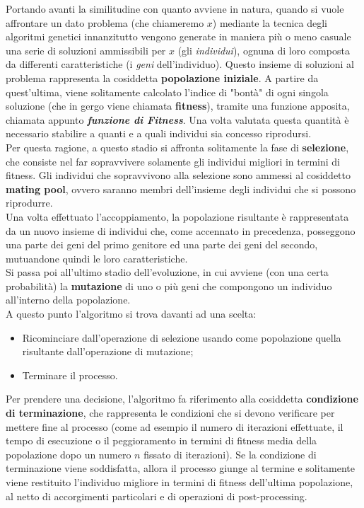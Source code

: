     Portando avanti la similitudine con quanto avviene in natura, quando si vuole affrontare un dato problema (che chiameremo $x$) mediante la tecnica degli algoritmi genetici innanzitutto vengono generate in maniera più o meno casuale una serie di soluzioni ammissibili per $x$ (gli \textit{individui}), ognuna di loro composta da differenti caratteristiche (i \textit{geni} dell'individuo). Questo insieme di soluzioni al problema rappresenta la cosiddetta \textbf{popolazione iniziale}. A partire da quest'ultima, viene solitamente calcolato l'indice di "bontà" di ogni singola soluzione (che in gergo viene chiamata \textbf{fitness}), tramite una funzione apposita, chiamata appunto \textbf{\textit{funzione di Fitness}}. Una volta valutata questa quantità è necessario stabilire a quanti e a quali individui sia concesso riprodursi. \\
    Per questa ragione, a questo stadio si affronta solitamente la fase di \textbf{selezione}, che consiste nel far sopravvivere solamente gli individui migliori in termini di fitness. Gli individui che sopravvivono alla selezione sono ammessi al cosiddetto \textbf{mating pool}, ovvero saranno membri dell'insieme degli individui che si possono riprodurre. \\
    Una volta effettuato l'accoppiamento, la popolazione risultante è rappresentata da un nuovo insieme di individui che, come accennato in precedenza, posseggono una parte dei geni del primo genitore ed una parte dei geni del secondo, mutuandone quindi le loro caratteristiche. \\
    Si passa poi all'ultimo stadio dell'evoluzione, in cui avviene (con una certa probabilità) la \textbf{mutazione} di uno o più geni che compongono un individuo all'interno della popolazione. \\
    A questo punto l'algoritmo si trova davanti ad una scelta: 
    \begin{itemize}
        \item Ricominciare dall'operazione di selezione usando come popolazione quella risultante dall'operazione di mutazione;
        \item Terminare il processo.
    \end{itemize}

    Per prendere una decisione, l'algoritmo fa riferimento alla cosiddetta \textbf{condizione di terminazione}, che rappresenta le condizioni che si devono verificare per mettere fine al processo (come ad esempio il numero di iterazioni effettuate, il tempo di esecuzione o il peggioramento in termini di fitness media della popolazione dopo un numero $n$ fissato di iterazioni). Se la condizione di terminazione viene soddisfatta, allora il processo giunge al termine e solitamente viene restituito l'individuo migliore in termini di fitness dell'ultima popolazione, al netto di accorgimenti particolari e di operazioni di post-processing.

